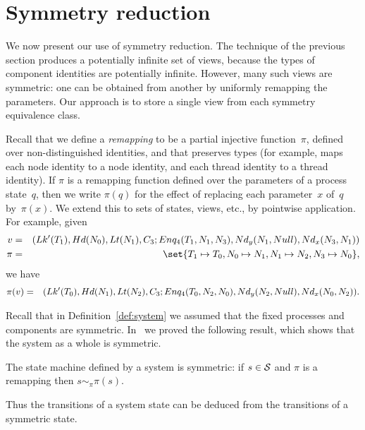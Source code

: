 \section{Symmetry reduction}
\label{sec:symmetry}

We now present our use of symmetry reduction.  The technique of the previous
section produces a potentially infinite set of views, because the types of
component identities are potentially infinite.  However, many such views are
symmetric: one can be obtained from another by uniformly remapping the
parameters.  Our approach is to store a single view from each symmetry
equivalence class.   

Recall that we define a \emph{remapping} to be a partial injective
function~$\pi$, defined over non-distinguished identities, and that preserves
types (for example, maps each node identity to a node identity, and each
thread identity to a thread identity).
%
If $\pi$ is a remapping function defined over the parameters of a process
state~$q$, then we write $\pi(q)$ for the effect of replacing each
parameter~$x$ of~$q$ by~$\pi(x)$.  We extend this to sets of states, views,
etc., by pointwise application.  For example, given
%
\begin{eqnarray*}
v & = & 
  \begin{align}
  (\Lock'(T_1), \Head(N_0), \Last(N_1), \Con_3; 
    Enq_4(T_1, N_1, N_3), \Node_y(N_1, Null),\Node_x(N_3, N_1))
  \end{align} \\
\pi & = & 
  \set{ T_1 \mapsto T_0, N_0 \mapsto N_1, N_1 \mapsto N_2, N_3 \mapsto N_0 },
\end{eqnarray*}
%
we have 
\begin{eqnarray*}
\pi(v) & = & 
  \begin{align}
  (\Lock'(T_0), \Head(N_1), \Last(N_2), \Con_3; 
   Enq_4(T_0, N_2, N_0), \Node_y(N_2, Null),\Node_x(N_0, N_2)) .
  \end{align}
\end{eqnarray*}


Recall that in Definition~\ref{def:system} we assumed that the fixed processes
and components are symmetric.  In~\cite{gavin:view-abs} we proved the
following result, which shows that the system as a whole is symmetric.
%
\begin{lemma}
\label{lem:system-pi-bisimilar}
The state machine defined by a system is symmetric: if $s \in \S$ and
$\pi$ is a remapping then $s \sim_\pi \pi(s)$.
\end{lemma}
%
Thus the transitions of a system state can be deduced from the transitions of
a symmetric state.

